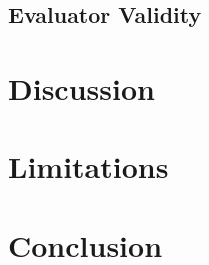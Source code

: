 \documentclass{article}
\begin{document}
\subsection{Evaluator Validity}



\section{Discussion}


\section{Limitations}



\section{Conclusion}






\clearpage


\appendix
\end{document}
